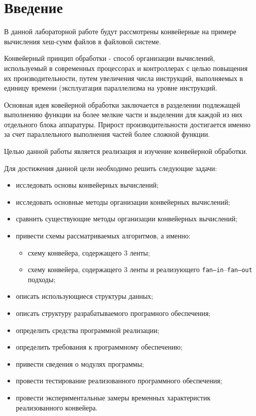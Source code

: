 \chapter*{Введение}

В данной лабораторной работе будут рассмотрены конвейерные на примере вычисления хеш-сумм файлов в файловой системе.

Конвейерный принцип обработки \cite{conveyer} - способ организации вычислений, используемый в современных процессорах и контроллерах с целью повыщения их производительности, путем увеличения числа инструкций, выполняемых в единицу времени (эксплуатация параллелизма на уровне инструкций.

Основная идея ковейерной обработки заключается в разделении подлежащей выполнению функции на более мелкие части и выделении для каждой из них отдельного блока аппаратуры. Прирост производительности достигается именно за счет параллельного выполнения частей более сложной функции.

Целью данной работы является реализация и изучение конвейерной обработки.

Для достижения данной цели необходимо решить следующие задачи:

\begin{itemize}
    \item исследовать основы конвейерных вычислений; 
	\item исследовать основные методы организации конвейерных вычислений;
	\item сравнить существующие методы организации конвейерных вычислений;
	\item привести схемы рассматриваемых алгоритмов, а именно:
	\begin{itemize}
	    \item схему конвейера, содержащего 3 ленты;
	    \item схему конвейера, содержащего 3 ленты и реализующего \texttt{fan--in}--\texttt{fan--out} подходы;
	\end{itemize}
	\item описать использующиеся структуры данных;
	\item описать структуру разрабатываемого програмного обеспечения;
	\item определить средства программной реализации;
	\item определить требования к программному обеспечению;
	\item привести сведения о модулях программы;
	\item провести тестирование реализованного программного обеспечения;
	\item провести экспериментальные замеры временных характеристик реализованного конвейера.
\end{itemize}
